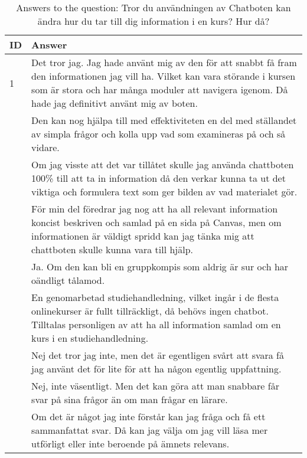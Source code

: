 \begin{table}[h]
\centering
{\small
\begin{tabularx}{\textwidth}{@{}lX@{}}
\toprule
\textbf{ID} & \textbf{Answer} \\ \midrule
1 & Det tror jag. Jag hade använt mig av den för att snabbt få fram den informationen jag vill ha. Vilket kan vara störande i kursen som är stora och har många moduler att navigera igenom. Då hade jag definitivt använt mig av boten. \\ \hdashline
2 & Den kan nog hjälpa till med effektiviteten en del med ställandet av simpla frågor och kolla upp vad som examineras på och så vidare. \\ \hdashline
3 & Om jag visste att det var tillåtet skulle jag använda chattboten 100\% till att ta in information då den verkar kunna ta ut det viktiga och formulera text som ger bilden av vad materialet gör. \\ \hdashline
4 & För min del föredrar jag nog att ha all relevant information koncist beskriven och samlad på en sida på Canvas, men om informationen är väldigt spridd kan jag tänka mig att chattboten skulle kunna vara till hjälp. \\ \hdashline
5 & Ja. Om den kan bli en gruppkompis som aldrig är sur och har oändligt tålamod. \\ \hdashline
6 & En genomarbetad studiehandledning, vilket ingår i de flesta onlinekurser är fullt tillräckligt, då behövs ingen chatbot. Tilltalas personligen av att ha all information samlad om en kurs i en studiehandledning. \\ \hdashline
7 & Nej det tror jag inte, men det är egentligen svårt att svara få jag använt det för lite för att ha någon egentlig uppfattning. \\ \hdashline
8 & Nej, inte väsentligt. Men det kan göra att man snabbare får svar på sina frågor än om man frågar en lärare. \\ \hdashline
9 & Om det är något jag inte förstår kan jag fråga och få ett sammanfattat svar. Då kan jag välja om jag vill läsa mer utförligt eller inte beroende på ämnets relevans. \\
\bottomrule
\end{tabularx}
}
\vspace{2mm}
\caption{Answers to the question: Tror du användningen av Chatboten kan ändra hur du tar till dig information i en kurs? Hur då?}
\label{tab:appendix_typeform_table_question_changed_access}
\end{table}

